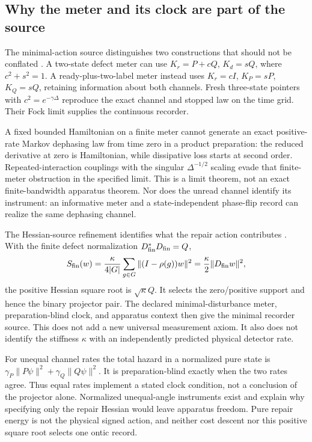 \documentclass[11pt]{article}
\begin{document}
\subsection{Why the meter and its clock are part of the source}
\label{sec:minimal-recorder}
The minimal-action source distinguishes two constructions that should not
be conflated \cite{FrozenMinimal}. A two-state defect meter can use
\(K_r=P+cQ\), \(K_d=sQ\), where \(c^2+s^2=1\). A ready-plus-two-label
meter instead uses \(K_r=cI\), \(K_P=sP\), \(K_Q=sQ\), retaining
information about both channels. Fresh three-state pointers with
\(c^2=e^{-\gamma\Delta}\) reproduce the exact channel and stopped law on
the time grid. Their Fock limit supplies the continuous recorder.

A fixed bounded Hamiltonian on a finite meter cannot generate an exact
positive-rate Markov dephasing law from time zero in a product preparation:
the reduced derivative at zero is Hamiltonian, while dissipative loss
starts at second order. Repeated-interaction couplings with the singular
\(\Delta^{-1/2}\) scaling evade that finite-meter obstruction in the
specified limit. This is a limit theorem, not an exact finite-bandwidth
apparatus theorem. Nor does the unread channel identify its instrument:
an informative meter and a state-independent phase-flip record can realize
the same dephasing channel.

\label{sec:hessian-recorder}
The Hessian-source refinement identifies what the repair action contributes
\cite{FrozenHessian}. With the finite defect normalization
\(D_{\rm fin}^*D_{\rm fin}=Q\),
\[
S_{\rm fin}(w)=\frac{\kappa}{4|G|}
\sum_{g\in G}\|(I-\rho(g))w\|^2
=\frac\kappa2\|D_{\rm fin}w\|^2,
\]
the positive Hessian square root is \(\sqrt\kappa Q\). It selects the
zero/positive support and hence the binary projector pair. The declared
minimal-disturbance meter, preparation-blind clock, and apparatus context
then give the minimal recorder source. This does not add a new universal
measurement axiom. It also does not identify the stiffness \(\kappa\) with
an independently predicted physical detector rate.

For unequal channel rates the total hazard in a normalized pure state is
\(\gamma_P\|P\psi\|^2+\gamma_Q\|Q\psi\|^2\). It is preparation-blind
exactly when the two rates agree. Thus equal rates implement a stated clock
condition, not a conclusion of the projector alone. Normalized unequal-angle
instruments exist and explain why specifying only the repair Hessian would
leave apparatus freedom. Pure repair energy is not the physical signed
action, and neither cost descent nor this positive square root selects one
ontic record.
\end{document}
